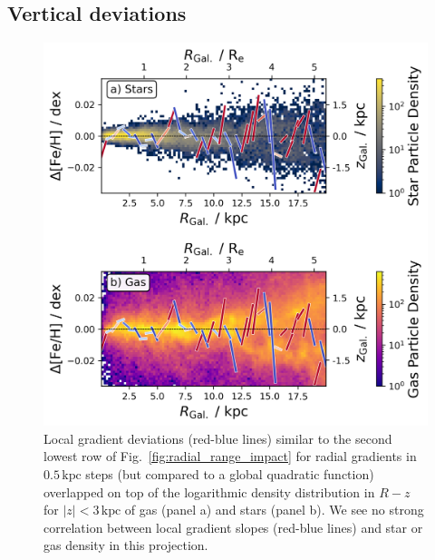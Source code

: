\documentclass[twocolumn,apj,numberedappendix,appendixfloats,twocolappendix]{openjournal}
\begin{document}
\begin{CJK*}{UTF8}{gbsn}
\subsection{Vertical deviations}
\label{sec:coherence_vertical_radial_metallicity_gradients}

\begin{figure}
    \centering
    \includegraphics[width=\columnwidth]{figures/overlap_local_variation_gas.png}
    \caption{Local gradient deviations (red-blue lines) similar to the second lowest row of Fig.~\ref{fig:radial_range_impact} for radial gradients in $0.5\,\mathrm{kpc}$ steps (but compared to a global quadratic function) overlapped on top of the logarithmic density distribution in $R-z$ for $\vert z \vert < 3\,\mathrm{kpc}$ of gas (panel a) and stars (panel b). We see no strong correlation between local gradient slopes (red-blue lines) and star or gas density in this projection.}
    \label{fig:overlap_local_variation_gas}
\end{figure}


\end{CJK*}
\end{document}

